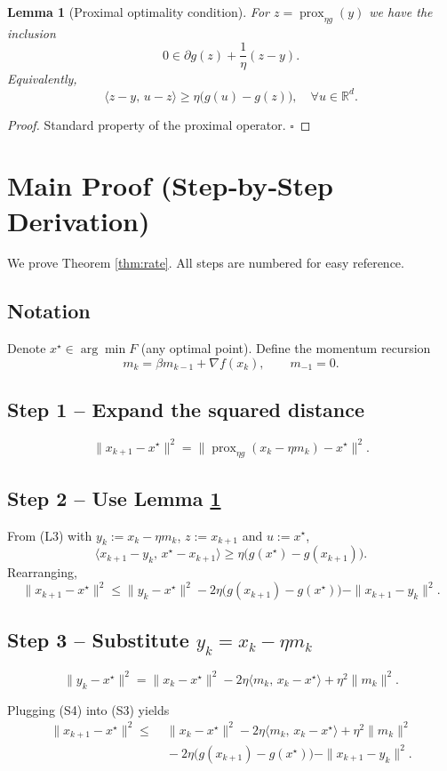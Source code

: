 \documentclass{article}
\newtheorem{lemma}{Lemma}
\newcommand{\prox}{\operatorname{prox}}
\newcommand{\grad}{\nabla}
\begin{document}
\begin{lemma}[Proximal optimality condition]\label{lem:prox}
For $z=\prox_{\eta g}(y)$ we have the inclusion
\[
0\in \partial g(z)+\frac{1}{\eta}(z-y).
\tag{L2}
\]
Equivalently,
\[
\langle z-y,\,u-z\rangle\ge \eta\bigl(g(u)-g(z)\bigr),\quad\forall u\in\mathbb{R}^d .
\tag{L3}
\]
\end{lemma}
\begin{proof}
Standard property of the proximal operator. $\square$
\end{proof}

\section*{Main Proof (Step‑by‑Step Derivation)}
We prove Theorem \ref{thm:rate}.  All steps are numbered for easy reference.

\subsection*{Notation}
Denote $x^\star\in\arg\min F$ (any optimal point).  Define the momentum recursion
\[
m_k=\beta m_{k-1}+\grad f(x_k),\qquad m_{-1}=0.
\tag{N1}
\]

\subsection*{Step 1 – Expand the squared distance}
\[
\|x_{k+1}-x^\star\|^{2}
= \bigl\| \prox_{\eta g}(x_k-\eta m_k)-x^\star\bigr\|^{2}.
\tag{S1}
\]

\subsection*{Step 2 – Use Lemma \ref{lem:prox}}
From (L3) with $y_k:=x_k-\eta m_k$, $z:=x_{k+1}$ and $u:=x^\star$,
\[
\langle x_{k+1}-y_k,\,x^\star-x_{k+1}\rangle
\ge\eta\bigl(g(x^\star)-g(x_{k+1})\bigr).
\tag{S2}
\]
Rearranging,
\[
\|x_{k+1}-x^\star\|^{2}
\le \|y_k-x^\star\|^{2}
-2\eta\bigl(g(x_{k+1})-g(x^\star)\bigr)
-\|x_{k+1}-y_k\|^{2}.
\tag{S3}
\]

\subsection*{Step 3 – Substitute $y_k=x_k-\eta m_k$}
\[
\|y_k-x^\star\|^{2}
= \|x_k-x^\star\|^{2}
-2\eta\langle m_k,\,x_k-x^\star\rangle
+\eta^{2}\|m_k\|^{2}.
\tag{S4}
\]

Plugging (S4) into (S3) yields
\[
\begin{aligned}
\|x_{k+1}-x^\star\|^{2}
\le &\;\|x_k-x^\star\|^{2}
-2\eta\langle m_k,\,x_k-x^\star\rangle
+\eta^{2}\|m_k\|^{2}\\
&\;-2\eta\bigl(g(x_{k+1})-g(x^\star)\bigr)
-\|x_{k+1}-y_k\|^{2}.
\end{aligned}
\tag{S5}
\]
\end{document}
